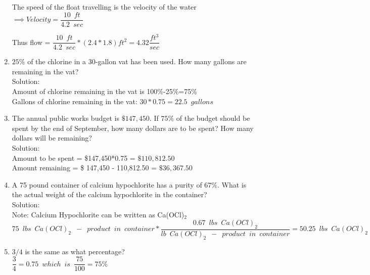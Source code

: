 \begin{enumerate}[1.]
The speed of the float travelling is the velocity of the water $\implies Velocity = \dfrac{10 \enspace ft}{4.2 \enspace sec}$

Thus flow = $\dfrac{10 \enspace ft}{4.2 \enspace sec} * (2.4*1.8) ft^2 = \boxed{4.32 \dfrac{ft^3}{sec}} $\\

\vspace{0.2cm}

\item $25 \%$ of the chlorine in a 30-gallon vat has been used. How many gallons are remaining in the vat?\\
Solution:\\
Amount of chlorine remaining in the vat is 100\%-25\%=75\%\\

Gallons of chlorine remaining in the vat: $30*0.75=\boxed{22.5 \enspace gallons}$


\item The annual public works budget is $\$ 147,450$. If $75 \%$ of the budget should be spent by the end of September, how many dollars are to be spent? How many dollars will be remaining?\\
\vspace{0.2cm}
Solution:\\
Amount to be spent = \$147,450*0.75 = $\boxed{\$110,812.50}$\\
\vspace{0.2cm}
Amount remaining = \$ 147,450 - 110,812.50 = $\boxed{\$36,367.50}$

\item A 75 pound container of calcium hypochlorite has a purity of $67 \%$. What is the actual weight of the calcium hypochlorite in the container? \\
\vspace{0.2cm}
Solution:\\
Note: Calcium Hypochlorite can be written as Ca(OCl)$_2$\\
$75 \enspace lbs \enspace Ca(OCl)_2 \enspace - \enspace product \enspace in \enspace container*\dfrac{0.67 \enspace lbs \enspace Ca(OCl)_2 }{lb \enspace Ca(OCl)_2  \enspace - \enspace product \enspace in \enspace container} = \boxed{50.25 \enspace lbs \enspace Ca(OCl)_2}$\\
\vspace{0.2cm}


\item $3 / 4$ is the same as what percentage?\\
\vspace{0.2cm}
$\dfrac{3}{4}=0.75 \enspace which \enspace is \enspace \dfrac{75}{100} = \boxed{75\%}$\\
\vspace{0.2cm}


\end{enumerate}
